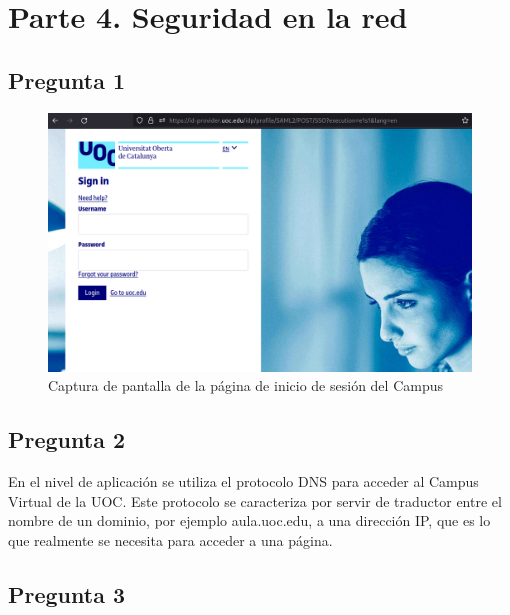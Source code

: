 \documentclass[spanish]{report} %
\begin{document}
\newpage
\section{Parte 4. Seguridad en la red}

\subsection{Pregunta 1}

\begin{figure}[h]
\begin{center}
\includegraphics[scale=.3]{../img/12.png}
\end{center}
\caption{Captura de pantalla de la página de inicio de sesión del Campus}
\end{figure}

\subsection{Pregunta 2}

En el nivel de aplicación se utiliza el protocolo DNS para acceder al Campus
Virtual de la UOC. Este protocolo se caracteriza por servir de traductor entre
el nombre de un dominio, por ejemplo aula.uoc.edu, a una dirección IP, que es lo
que realmente se necesita para acceder a una página.

\newpage

\subsection{Pregunta 3}
\end{document}
